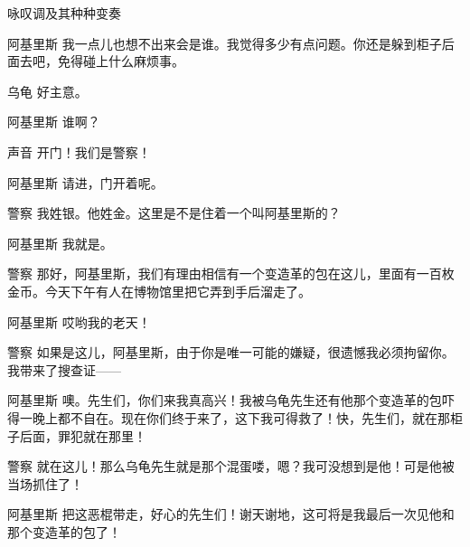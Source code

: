 \begin{dialog}{咏叹调及其种种变奏}
\begin{dialogue}
\item[阿基里斯]我一点儿也想不出来会是谁。我觉得多少有点问题。你还是躲到柜子后面去吧，免得碰上什么麻烦事。

\item[乌龟]好主意。

\item[阿基里斯]谁啊？

\item[声音]开门！我们是警察！

\item[阿基里斯]请进，门开着呢。


\item[警察]我姓银。他姓金。这里是不是住着一个叫阿基里斯的？

\item[阿基里斯]我就是。

\item[警察]那好，阿基里斯，我们有理由相信有一个变造革的包在这儿，里面有一百枚金币。今天下午有人在博物馆里把它弄到手后溜走了。

\item[阿基里斯]哎哟我的老天！

\item[警察]如果是这儿，阿基里斯，由于你是唯一可能的嫌疑，很遗憾我必须拘留你。我带来了搜查证——

\item[阿基里斯]噢。先生们，你们来我真高兴！我被乌龟先生还有他那个变造革的包吓得一晚上都不自在。现在你们终于来了，这下我可得救了！快，先生们，就在那柜子后面，罪犯就在那里！

\item[警察]就在这儿！那么乌龟先生就是那个混蛋喽，嗯？我可没想到是他！可是他被当场抓住了！

\item[阿基里斯]把这恶棍带走，好心的先生们！谢天谢地，这可将是我最后一次见他和那个变造革的包了！

\end{dialogue}

\end{dialog}
